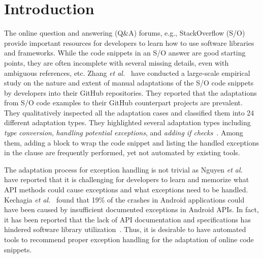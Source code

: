 \section{Introduction}
\label{sec:intro}

The online question and answering (Q\&A) forums, e.g., StackOverflow
(S/O) provide important resources for developers to learn how to use
software libraries and frameworks. While the code snippets in an S/O
answer are good starting points, they are often incomplete with
several missing details, even with ambiguous references, etc.  Zhang
{\em et al.}~\cite{zhang-icse19} have conducted a large-scale
empirical study on the nature and extent of manual adaptations of the
S/O code snippets by developers into their GitHub repositories.  They
reported that the adaptations from S/O code examples to their GitHub
counterpart projects are prevalent. They qualitatively inspected all
the adaptation cases and classified them into 24 different adaptation
types. They highlighted several adaptation types including {\em type
  conversion}, {\em handling potential exceptions}, and {\em adding if
  checks}~\cite{zhang-icse19}. Among them, adding a 
block to wrap the code snippet and listing the handled exceptions in
the  clause are frequently performed,
yet not automated by existing tools.


The adaptation process for exception handling is not trivial as Nguyen
{\em et al.}~\cite{xrank-fse20} have reported that it is challenging
for developers to learn and memorize what API methods could cause
exceptions and what exceptions need to be handled. Kechagia {\em et
  al.}~\cite{kechagia-msr14} found that 19\% of the crashes in Android
applications could have been caused by insufficient documented
exceptions in Android APIs. In fact, it has been reported that the
lack of API documentation and specifications has hindered software library
utilization~\cite{dagenais-fse10}. Thus, it is desirable to have 
automated tools to recommend proper exception handling for the
adaptation of online code snippets.

